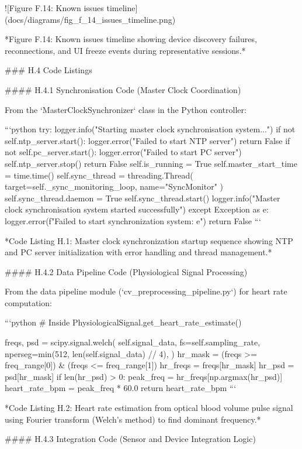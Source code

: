 \documentclass[12pt,a4paper]{article}
\begin{document}
{![Figure F.14: Known issues timeline](docs/diagrams/fig_f_14_issues_timeline.png)

*Figure F.14: Known issues timeline showing device discovery failures, reconnections, and UI freeze events during representative sessions.*

### H.4 Code Listings

#### H.4.1 Synchronisation Code (Master Clock Coordination)

From the `MasterClockSynchronizer` class in the Python controller:

```python
try:
    logger.info("Starting master clock synchronisation system...")
    if not self.ntp_server.start():
        logger.error("Failed to start NTP server")
        return False
    if not self.pc_server.start():
        logger.error("Failed to start PC server")
        self.ntp_server.stop()
        return False
    self.is_running = True
    self.master_start_time = time.time()
    self.sync_thread = threading.Thread(
        target=self._sync_monitoring_loop,
        name="SyncMonitor"
    )
    self.sync_thread.daemon = True
    self.sync_thread.start()
    logger.info("Master clock synchronisation system started successfully")
except Exception as e:
    logger.error(f"Failed to start synchronization system: {e}")
    return False
```

*Code Listing H.1: Master clock synchronization startup sequence showing NTP and PC server initialization with error handling and thread management.*

#### H.4.2 Data Pipeline Code (Physiological Signal Processing)

From the data pipeline module (`cv_preprocessing_pipeline.py`) for heart rate computation:

```python
# Inside PhysiologicalSignal.get_heart_rate_estimate()

freqs, psd = scipy.signal.welch(
    self.signal_data,
    fs=self.sampling_rate,
    nperseg=min(512, len(self.signal_data) // 4),
)
hr_mask = (freqs >= freq_range[0]) & (freqs <= freq_range[1])
hr_freqs = freqs[hr_mask]
hr_psd = psd[hr_mask]
if len(hr_psd) > 0:
    peak_freq = hr_freqs[np.argmax(hr_psd)]
    heart_rate_bpm = peak_freq * 60.0
    return heart_rate_bpm
```

*Code Listing H.2: Heart rate estimation from optical blood volume pulse signal using Fourier transform (Welch's method) to find dominant frequency.*

#### H.4.3 Integration Code (Sensor and Device Integration Logic)

}
\end{document}
